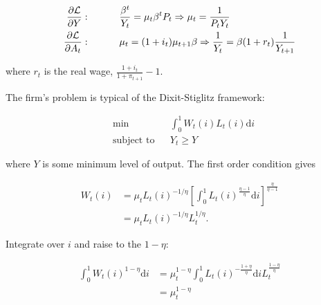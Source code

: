 \documentclass[12pt,a4paper]{scrartcl}            %
\begin{document}
\begin{equation}
\begin{aligned}
    \label{eqa:focs}
    \frac{\partial \Lagr}{\partial Y} & :   \ \ \ \ \ \ \ \ \  \frac{\beta^t}{Y_t} = \mu_t \beta^t P_t \Rightarrow \mu_t = \frac{1}{P_t Y_t} \\
    \frac{\partial \Lagr}{\partial A_t} & : \ \ \ \ \ \ \ \ \  \mu_t = (1 + i_t) \mu_{t + 1} \beta \Rightarrow \frac{1}{Y_t} = \beta (1 + r_t) \frac{1}{Y_{t+1}}
\end{aligned}
\end{equation}

where $r_t$ is the real wage, $\frac{1 + i_t}{1 + \pi_{t+1}} - 1$.

The firm's problem is typical of the Dixit-Stiglitz framework:

\begin{equation}
    \label{eqa:firms_problem}
    \begin{aligned}
        & \min
        & & \int_{0}^{1} \! W_t(i)L_t(i) \mathrm{d}i \\
        & \text{subject to}
        & & Y_t \geq Y
    \end{aligned}
\end{equation}

where $Y$ is some minimum level of output.  The first order condition gives

\begin{equation}
    \label{eqa:firms_foc}
    \begin{aligned}
        W_t(i) &= \mu_t L_t(i)^{-1 / \eta} \left[ \int_{0}^{1} \! L_t(i)^{\frac{\eta - 1}{\eta}} \mathrm{d}i \right]^{\frac{\eta}{\eta - 1}}\\
               &= \mu_t L_t(i)^{-1 / \eta} L_t^{1 / \eta}.
    \end{aligned}
\end{equation}

Integrate over $i$ and raise to the $1 - \eta$:

\begin{equation}
    \label{eqa:firms_foc2}
    \begin{aligned}
        \int_{0}^{1} \! W_t(i)^{1 - \eta} \mathrm{d}i &= \mu_t^{1 - \eta} \int_{0}^{1} \! L_t(i)^{-\frac{1 + \eta}{\eta}} \mathrm{d}i L_t^{\frac{1 - \eta}{\eta}}\\
                                                      &= \mu_t^{1 - \eta}
    \end{aligned}
\end{equation}
\end{document}
